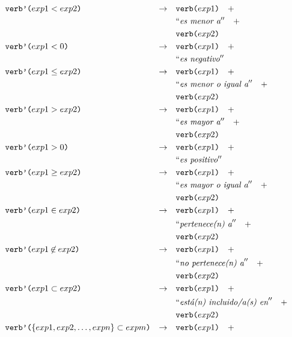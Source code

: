 \begin{align*}
&\nlgfun{verb'($exp1 < exp2$)} & \rightarrow \quad & \nlgfun{verb($exp1$)} \quad +  \\
& &											 		& \nlgtext{es menor a} \quad +  \\
& &											 		& \nlgfun{verb($exp2$)} \\
&\nlgfun{verb'($exp1 < 0$)} & \rightarrow \quad & \nlgfun{verb($exp1$)} \quad +  \\
& &											 		& \nlgtext{es negativo} \\
&\nlgfun{verb'($exp1 \leq exp2$)} & \rightarrow \quad & \nlgfun{verb($exp1$)} \quad +  \\
& &											 		& \nlgtext{es menor o igual a} \quad +  \\
& &											 		& \nlgfun{verb($exp2$)} \\
&\nlgfun{verb'($exp1 > exp2$)} & \rightarrow \quad & \nlgfun{verb($exp1$)} \quad +  \\
& &											 		& \nlgtext{es mayor a} \quad +  \\
& &											 		& \nlgfun{verb($exp2$)} \\
&\nlgfun{verb'($exp1 > 0$)} & \rightarrow \quad & \nlgfun{verb($exp1$)} \quad +  \\
& &											 		& \nlgtext{es positivo} \\
&\nlgfun{verb'($exp1 \geq exp2$)} & \rightarrow \quad & \nlgfun{verb($exp1$)} \quad +  \\
& &											 		& \nlgtext{es mayor o igual a} \quad +  \\
& &											 		& \nlgfun{verb($exp2$)} \\
&\nlgfun{verb'($exp1 \in exp2$)} & \rightarrow \quad & \nlgfun{verb($exp1$)} \quad +  \\
& &											 		& \nlgtext{pertenece(n) a} \quad +  \\
& &											 		& \nlgfun{verb($exp2$)} \\
&\nlgfun{verb'($exp1 \notin exp2$)} & \rightarrow \quad & \nlgfun{verb($exp1$)} \quad +  \\
& &											 		& \nlgtext{no pertenece(n) a} \quad +  \\
& &											 		& \nlgfun{verb($exp2$)} \\
&\nlgfun{verb'($exp1 \subset exp2$)} & \rightarrow \quad & \nlgfun{verb($exp1$)} \quad +  \\
& &											 		& \nlgtext{está(n) incluido/a(s) en} \quad +  \\
& &											 		& \nlgfun{verb($exp2$)} \\
&\nlgfun{verb'($\{exp1, exp2, \ldots , expn\} \subset expm$)} & \rightarrow \quad & \nlgfun{verb($exp1$)} \quad +  \\

\end{align*}
